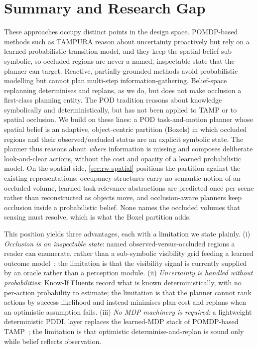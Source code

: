\section{Summary and Research Gap}
These approaches occupy distinct points in the design space. POMDP-based methods such as TAMPURA \cite{curtis2024partially} reason about uncertainty proactively but rely on a learned probabilistic transition model, and they keep the spatial belief sub-symbolic, so occluded regions are never a named, inspectable state that the planner can target. Reactive, partially-grounded methods \cite{pan2024task} avoid probabilistic modelling but cannot plan multi-step information-gathering. Belief-space replanning \cite{garrett2020online} determinises and replans, as we do, but does not make occlusion a first-class planning entity. The POD tradition \cite{bonet2014flexible} reasons about knowledge symbolically and deterministically, but has not been applied to TAMP or to spatial occlusion. We build on these lines: a POD task-and-motion planner whose spatial belief is an adaptive, object-centric partition (Boxels) in which occluded regions and their observed/occluded status are an explicit symbolic state. The planner thus reasons about \emph{where} information is missing and composes deliberate look-and-clear actions, without the cost and opacity of a learned probabilistic model. On the spatial side, \cref{sec:rw-spatial} positions the partition against the existing representations: occupancy structures carry no semantic notion of an occluded volume, learned task-relevance abstractions are predicted once per scene rather than reconstructed as objects move, and occlusion-aware planners keep occlusion inside a probabilistic belief. None names the occluded volumes that sensing must resolve, which is what the Boxel partition adds.

This position yields three advantages, each with a limitation we state plainly. (i) \emph{Occlusion is an inspectable state}: named observed-versus-occluded regions a reader can enumerate, rather than a sub-symbolic visibility grid feeding a learned outcome model~\cite{curtis2024partially}; the limitation is that the visibility signal is currently supplied by an oracle rather than a perception module. (ii) \emph{Uncertainty is handled without probabilities}: Know-If Fluents record what is known deterministically, with no per-action probability to estimate; the limitation is that the planner cannot rank actions by success likelihood and instead minimises plan cost and replans when an optimistic assumption fails. (iii) \emph{No MDP machinery is required}: a lightweight deterministic PDDL layer replaces the learned-MDP stack of POMDP-based TAMP~\cite{curtis2024partially}; the limitation is that optimistic determinise-and-replan is sound only while belief reflects observation.

